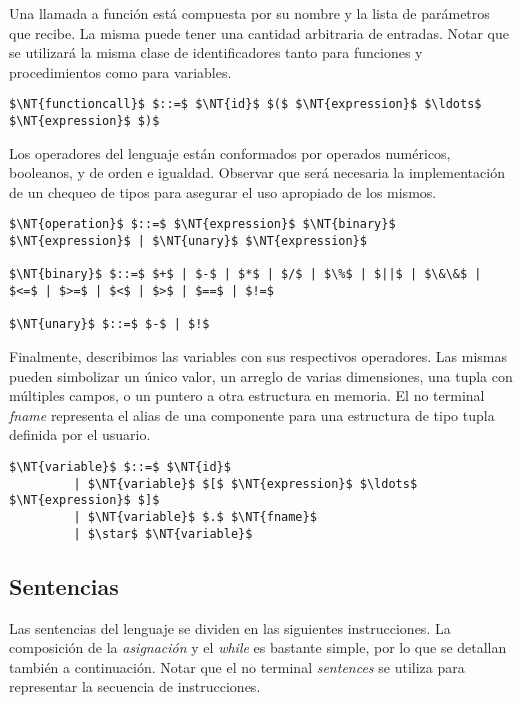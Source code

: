 Una llamada a función está compuesta por su nombre y la lista de parámetros que recibe.
La misma puede tener una cantidad arbitraria de entradas.
Notar que se utilizará la misma clase de identificadores tanto para funciones y procedimientos como para variables.

\begin{lstlisting}[style = syntax]
$\NT{functioncall}$ $::=$ $\NT{id}$ $($ $\NT{expression}$ $\ldots$ $\NT{expression}$ $)$
\end{lstlisting}

Los operadores del lenguaje están conformados por operados numéricos, booleanos, y de orden e igualdad.
Observar que será necesaria la implementación de un chequeo de tipos para asegurar el uso apropiado de los mismos.

\begin{lstlisting}[style = syntax]
$\NT{operation}$ $::=$ $\NT{expression}$ $\NT{binary}$ $\NT{expression}$ | $\NT{unary}$ $\NT{expression}$

$\NT{binary}$ $::=$ $+$ | $-$ | $*$ | $/$ | $\%$ | $||$ | $\&\&$ | $<=$ | $>=$ | $<$ | $>$ | $==$ | $!=$

$\NT{unary}$ $::=$ $-$ | $!$
\end{lstlisting}

Finalmente, describimos las variables con sus respectivos operadores.
Las mismas pueden simbolizar un único valor, un arreglo de varias dimensiones, una tupla con múltiples campos, o un puntero a otra estructura en memoria.
El no terminal \textit{fname} representa el alias de una componente para una estructura de tipo tupla definida por el usuario.

\begin{lstlisting}[style = syntax]
$\NT{variable}$ $::=$ $\NT{id}$
         | $\NT{variable}$ $[$ $\NT{expression}$ $\ldots$ $\NT{expression}$ $]$
         | $\NT{variable}$ $.$ $\NT{fname}$
         | $\star$ $\NT{variable}$
\end{lstlisting}

\subsection{Sentencias}

Las sentencias del lenguaje se dividen en las siguientes instrucciones.
La composición de la \textit{asignación} y el \textit{while} es bastante simple, por lo que se detallan también a continuación.
Notar que el no terminal \textit{sentences} se utiliza para representar la secuencia de instrucciones.

